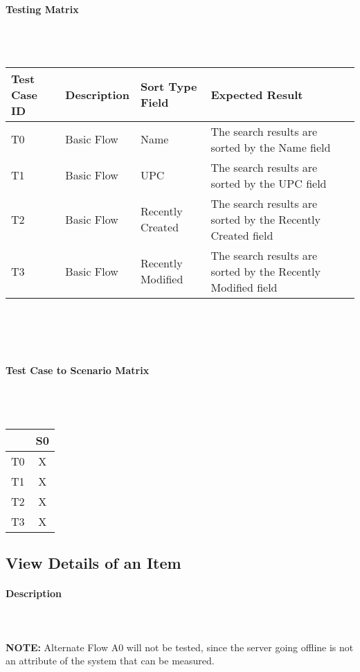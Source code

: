 \documentclass{article}
\begin{document}
\paragraph{Testing Matrix}~\\ \\
\begin{tabular}{ p{0.6in}  p{0.8in}  p{1.0in}  p{2.0in} }
\hline
Test Case ID & Description & Sort Type Field & Expected Result\\
\hline
\hline
T0 & Basic Flow & Name & The search results are sorted by the Name field\\
\hline
T1 & Basic Flow & UPC & The search results are sorted by the UPC field\\
\hline
T2 & Basic Flow & Recently Created & The search results are sorted by the Recently Created field\\
\hline
T3 & Basic Flow & Recently Modified & The search results are sorted by the Recently Modified field\\
\hline
\end{tabular}\\
~\\
~\\
\paragraph{Test Case to Scenario Matrix}~\\ \\
\begin{tabular}{ | c || c | }
\hline
    & S0\\
\hline
\hline
T0 & X  \\
\hline
T1 & X  \\
\hline
T2 & X  \\
\hline
T3 & X  \\
\hline
\end{tabular}

\subsection{View Details of an Item}
\paragraph{Description}
~\\ \\
\textbf{NOTE:} Alternate Flow A0 will not be tested, since the server going offline is not an attribute of the system that can be measured.
\end{document}
